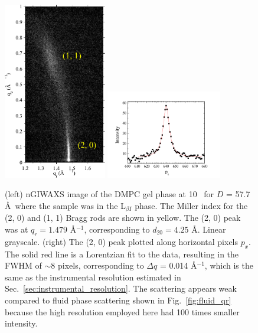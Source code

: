 \begin{figure}[htbp]
  \centering
  \includegraphics[width=0.4\textwidth]{figures/ripple/nGIWAXS/dmpc1_107}
  \qquad
  \includegraphics[trim=50 0 50 0,clip,width=0.45\textwidth]{figures/ripple/nGIWAXS/dmpc1_107_gel_phase_20_swath_8px}
  \caption[nGIWAXS of the DMPC gel phase]{(left) nGIWAXS image of the DMPC gel phase
  at 10 \textcelsius\ for $D$ = 57.7 \AA\ where the sample was in the 
  L$_{\beta I}$ phase. The Miller index for the (2, 0) and (1, 1) Bragg rods
  are shown in yellow. The (2, 0) peak was at
  $q_r=1.479$ \AA$^{-1}$, corresponding to $d_{20}=4.25$ \AA. Linear grayscale.
  (right) The (2, 0) peak plotted along horizontal pixels $p_x$. The solid red
  line is a Lorentzian fit to the data, resulting in the FWHM of $\sim$8 pixels,
  corresponding to $\Delta q$ = 0.014 \AA$^{-1}$,
  which is the same as the instrumental resolution 
  estimated in Sec.~\ref{sec:instrumental_resolution}.
  The scattering appears weak compared to fluid phase scattering shown in 
  Fig.~\ref{fig:fluid_qr} because the high resolution employed here had 100 
  times smaller intensity.}
  \label{fig:gel_phase}  
\end{figure}

